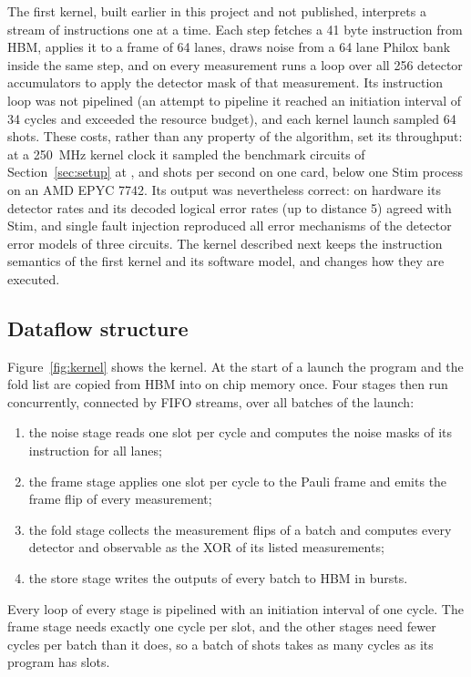 The first kernel, built earlier in this project and not published, interprets a stream of instructions one at a
time. Each step fetches a 41 byte
instruction from HBM, applies it to a frame of 64 lanes, draws noise from a 64 lane Philox bank inside the same step,
and on every measurement runs a loop over all 256 detector accumulators to apply the detector mask of that
measurement. Its instruction loop was not pipelined (an attempt to pipeline it reached an initiation interval of 34
cycles and exceeded the resource budget), and each kernel launch sampled 64 shots. These costs, rather than any
property of the algorithm, set its throughput: at a 250~MHz kernel clock it sampled the benchmark circuits of
Section~\ref{sec:setup} at \NumFirstKernelRep{}, \NumFirstKernelSurfThree{} and \NumFirstKernelSurfFive{} shots per
second on one card, below one Stim process on an AMD EPYC 7742. Its output was nevertheless correct: on hardware its
detector rates and its decoded logical error rates (up to distance 5) agreed with Stim, and single fault injection
reproduced all \NumFirstTierThreeTotal{} error mechanisms of the detector error models of three circuits. The kernel described next keeps the instruction semantics of the first
kernel and its software model, and changes how they are executed.

\subsection{Dataflow structure}\label{sec:dataflow}

Figure~\ref{fig:kernel} shows the kernel. At the start of a launch the program and the fold list are copied from HBM
into on chip memory once. Four stages then run concurrently, connected by FIFO streams, over all batches of the
launch:
\begin{enumerate}
\item the noise stage reads one slot per cycle and computes the noise masks of its instruction for all lanes;
\item the frame stage applies one slot per cycle to the Pauli frame and emits the frame flip of every
measurement;
\item the fold stage collects the measurement flips of a batch and computes every detector and observable as the XOR
of its listed measurements;
\item the store stage writes the outputs of every batch to HBM in bursts.
\end{enumerate}
Every loop of every stage is pipelined with an initiation interval of one cycle. The frame stage needs exactly one
cycle per slot, and the other stages need fewer cycles per batch than it does, so a batch of \NumLanes{} shots takes
as many cycles as its program has slots.

